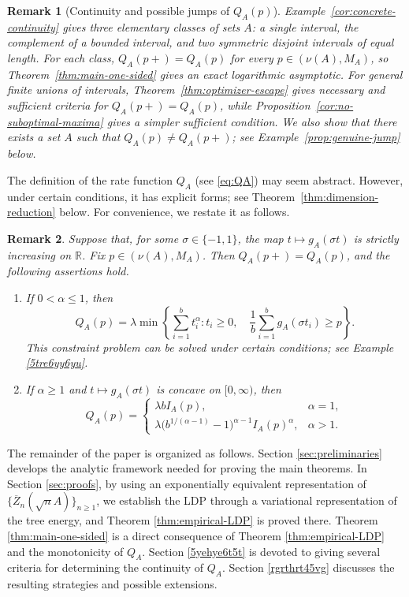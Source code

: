 \documentclass[a4paper, 11pt]{article}
\newcommand{\1}{\mathbf 1}
\theoremstyle{plain}
\newtheorem{remark}{Remark}[section]
\begin{document}
\begin{remark}[Continuity and possible jumps of $Q_A(p)$]
\label{rem:intro-continuity}
Example~\ref{cor:concrete-continuity} gives three elementary classes of sets $A$:
a single interval, the complement of a bounded interval, and two symmetric
disjoint intervals of equal length. For each class,
\(Q_A(p+)=Q_A(p)\) for every $p\in(\nu(A),M_A)$, so
Theorem~\ref{thm:main-one-sided} gives an exact logarithmic asymptotic. For general finite unions of intervals,
Theorem~\ref{thm:optimizer-escape} gives necessary and sufficient criteria for \(Q_A(p+)=Q_A(p)\),
while Proposition~\ref{cor:no-suboptimal-maxima} gives a simpler sufficient
condition. We also show that there exists a set $A$ such that \(Q_A(p)\neq Q_A(p+)\); see Example~\ref{prop:genuine-jump} below.
\end{remark}
The definition of the rate function $Q_A$ (see \eqref{eq:QA}) may seem abstract. However, under certain conditions, it has explicit forms; see Theorem~\ref{thm:dimension-reduction} below. For convenience, we restate it as follows.
\begin{remark}
Suppose that, for some \(\sigma\in\{-1,1\}\), the map
\(t\mapsto g_A(\sigma t)\) is strictly increasing on
 \(\mathbb{R}\). Fix $p\in(\nu(A),M_A)$. Then \(Q_A(p+)=Q_A(p)\), and the following assertions hold.
\begin{enumerate}
\item If \(0<\alpha\le1\), then
\begin{equation}
  Q_A(p)
  =\lambda\min\left\{
      \sum_{i=1}^b t_i^\alpha:
      t_i\ge0,\quad
      \frac1b\sum_{i=1}^b g_A(\sigma t_i)\ge p
    \right\}.
\end{equation}
This constraint problem can be solved under certain conditions; see Example \ref{5tre6yy6yu}.

\item If $\alpha\geq1$ and \(t\mapsto g_A(\sigma t)\) is concave on
\([0,\infty)\), then
\[
  Q_A(p)=
  \begin{cases}
    \lambda b I_A(p), & \alpha=1,\\[3pt]
    \lambda\bigl(b^{1/(\alpha-1)}-1\bigr)^{\alpha-1}I_A(p)^\alpha,
      & \alpha>1.
  \end{cases}
\]
\end{enumerate}

\end{remark}

The remainder of the paper is organized as follows. Section \ref{sec:preliminaries}
develops the analytic framework needed for proving the main theorems.
In Section \ref{sec:proofs}, by using an exponentially equivalent representation of $\{\overline Z_n(\sqrt n A)\}_{n\geq1}$,
we establish the LDP through a variational representation of the tree energy, and Theorem \ref{thm:empirical-LDP} is proved there.
Theorem \ref{thm:main-one-sided} is a direct consequence of Theorem \ref{thm:empirical-LDP} and the monotonicity of \(Q_A\).
Section \ref{5yehye6t5t} is devoted to giving several criteria for determining the continuity of $Q_A$. Section \ref{rgrthrt45vg} discusses
the resulting strategies and possible extensions.
\end{document}
